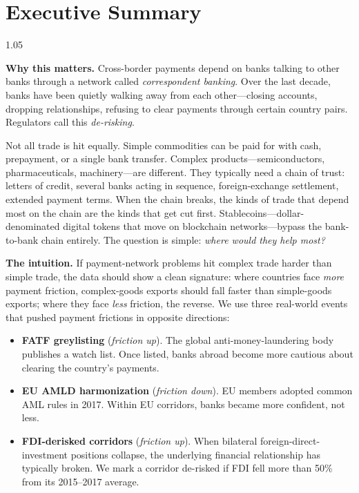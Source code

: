 \section*{Executive Summary}
\label{sec:exec_summary}

\begin{spacing}{1.05}

\noindent\textbf{Why this matters.} Cross-border payments depend on banks talking to other banks through a network called \emph{correspondent banking}. Over the last decade, banks have been quietly walking away from each other---closing accounts, dropping relationships, refusing to clear payments through certain country pairs. Regulators call this \emph{de-risking}.

\smallskip

\noindent Not all trade is hit equally. Simple commodities can be paid for with cash, prepayment, or a single bank transfer. Complex products---semiconductors, pharmaceuticals, machinery---are different. They typically need a chain of trust: letters of credit, several banks acting in sequence, foreign-exchange settlement, extended payment terms. When the chain breaks, the kinds of trade that depend most on the chain are the kinds that get cut first. Stablecoins---dollar-denominated digital tokens that move on blockchain networks---bypass the bank-to-bank chain entirely. The question is simple: \emph{where would they help most?}

\smallskip

\noindent\textbf{The intuition.} If payment-network problems hit complex trade harder than simple trade, the data should show a clean signature: where countries face \emph{more} payment friction, complex-goods exports should fall faster than simple-goods exports; where they face \emph{less} friction, the reverse. We use three real-world events that pushed payment frictions in opposite directions:
\begin{itemize}[leftmargin=*, itemsep=0pt, topsep=2pt]
\item \textbf{FATF greylisting} (\emph{friction up}). The global anti-money-laundering body publishes a watch list. Once listed, banks abroad become more cautious about clearing the country's payments.
\item \textbf{EU AMLD harmonization} (\emph{friction down}). EU members adopted common AML rules in 2017. Within EU corridors, banks became more confident, not less.
\item \textbf{FDI-derisked corridors} (\emph{friction up}). When bilateral foreign-direct-investment positions collapse, the underlying financial relationship has typically broken. We mark a corridor de-risked if FDI fell more than 50\% from its 2015--2017 average.
\end{itemize}


\end{spacing}

